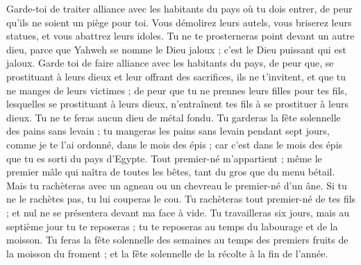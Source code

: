 \begin{multicols}{2}
Garde-toi de traiter alliance avec les habitants du pays où tu dois entrer, de peur qu’ils ne soient un piège pour toi.
Vous démolirez leurs autels, vous briserez leurs statues, et vous abattrez leurs idoles.
Tu ne te prosterneras point devant un autre dieu, parce que Yahweh se nomme le Dieu jaloux ; c'est le Dieu puissant qui est jaloux.
Garde toi de faire alliance avec les habitants du pays, de peur que, se prostituant à leurs dieux et leur offrant des sacrifices, ils ne t’invitent, et que tu ne manges de leurs victimes ;
de peur que tu ne prennes leurs filles pour tes fils, lesquelles se prostituant à leurs dieux, n’entraînent tes fils à se prostituer à leurs dieux.
Tu ne te feras aucun dieu de métal fondu.
Tu garderas la fête solennelle des pains sans levain ; tu mangeras les pains sans levain pendant sept jours, comme je te l'ai ordonné, dans le mois des épis ; car c’est dans le mois des épis que tu es sorti du pays d'Egypte.
Tout premier-né m’appartient ; même le premier mâle qui naîtra de toutes les bêtes, tant du gros que du menu bétail.
Mais tu rachèteras avec un agneau ou un chevreau le premier-né d'un âne. Si tu ne le rachètes pas, tu lui couperas le cou. Tu rachèteras tout premier-né de tes fils ; et nul ne se présentera devant ma face à vide.
Tu travailleras six jours, mais au septième jour tu te reposeras ; tu te reposeras au temps du labourage et de la moisson.
Tu feras la fête solennelle des semaines au temps des premiers fruits de la moisson du froment ; et la fête solennelle de la récolte à la fin de l'année.

\end{multicols}
